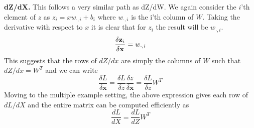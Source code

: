 \documentclass[a4paper,10pt]{article}
\newcommand{\xb}{\mathbf{x}}
\begin{document}
\vspace{10pt}\noindent\textbf{dZ/dX.} This follows a very similar path as dZ/dW. We again consider the $i$'th element of $z$ as $z_i = xw_{\cdot, i}+b_i$ where $w_{\cdot, i}$ is the i'th column of $W$. Taking the derivative with respect to $x$ it is clear that for $z_i$ the result will be $w_{\cdot,i}$.
%
\begin{eqnarray}
\frac{\delta \zb_i}{\delta \xb} = w_{\cdot, i}
\end{eqnarray}
%
This suggests that the rows of $dZ/dx$ are simply the columns of $W$ such that $dZ/dx = W^T$ and we can write 
%
\begin{equation}
    \frac{\delta L}{\delta \xb} = \frac{\delta L}{\delta z}\frac{\delta z}{\delta \xb} = \frac{\delta L}{\delta z}W^T
\end{equation}
%
Moving to the multiple example setting, the above expression gives each row of $dL/dX$ and the entire matrix can be computed efficiently as
\begin{equation}
    \frac{dL}{dX} = \frac{dL}{dZ} W^T
    \label{eq:dldx}
\end{equation}
\end{document}
